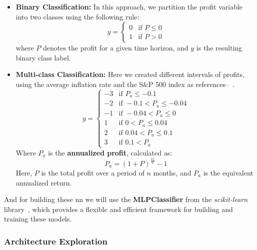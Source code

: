 \documentclass[11pt,english,a4paper,hidelinks]{book}
\begin{document}
\begin{itemize}
    \item \textbf{Binary Classification:} In this approach, we partition the profit variable into two classes using the following rule:
    \begin{equation}
        y = 
        \begin{cases}
            0 & \text{if } P \leq 0 \\
            1 & \text{if } P > 0
        \end{cases}
    \end{equation}
    where \(P\) denotes the profit for a given time horizon, and \(y\) is the resulting binary class label.

    \item \textbf{Multi-class Classification:} Here we created different intervals of profits, using the average inflation rate and the S\&P 500 index as references--~\cite{global_inflation, sp500}.
    \begin{equation}
        y =
        \begin{cases}
            -3 & \text{if } P_a \leq -0.1 \\
            -2 & \text{if } -0.1 < P_a \leq -0.04 \\
            -1 & \text{if } -0.04 < P_a \leq 0 \\
             1 & \text{if } 0 < P_a \leq 0.04 \\
             2 & \text{if } 0.04 < P_a \leq 0.1 \\
             3 & \text{if } 0.1 < P_a
        \end{cases}
    \end{equation}
    \noindent Where \(P_a\) is the \textbf{annualized profit}, calculated as:
    \begin{equation}
        P_a = (1 + P)^{\frac{12}{n}} - 1
    \end{equation}
    \noindent Here, \(P\) is the total profit over a period of \(n\) months, and \(P_a\) is the equivalent annualized return.
\end{itemize}

\noindent And for building these \acrshort{nn} we will use the \textbf{MLPClassifier} from the \textit{scikit-learn} library~\cite{scikit2025mlpclassifier}, which provides a flexible and efficient framework for building and training these models. 

\subsubsection{Architecture Exploration}
\end{document}
